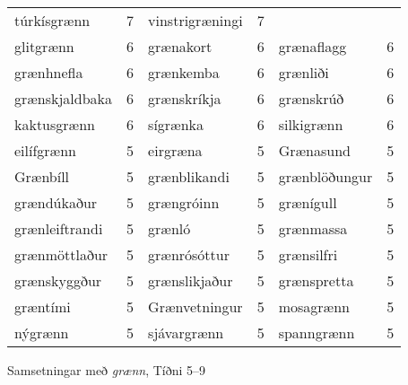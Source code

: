 \documentclass[../samsetningasafn.tex]{subfiles}
\begin{document}
\begin{wordlist}[H]
\begin{tcolorbox}
\begin{tabular}{BlBlBl}
		túrkísgrænn		& 7		& 		
		vinstrigræningi	& 7		\\ 	
		glitgrænn		& 6		& 	
		grænakort		& 6		& 	
		grænaflagg		& 6		\\ 	
		grænhnefla		& 6		& 	
		grænkemba		& 6		& 	
		grænliði			& 6		\\ 	
		grænskjaldbaka	& 6		& 	
		grænskríkja		& 6		& 	
		grænskrúð		& 6		\\ 	
		kaktusgrænn		& 6		& 
		sígrænka		& 6		& 	
		silkigrænn		& 6		\\ 
		eilífgrænn		& 5		& 	
		eirgræna		& 5		& 	
		Grænasund		& 5		\\ 	
		Grænbíll			& 5		& 	
		grænblikandi		& 5		& 
		grænblöðungur	& 5		\\ 	
		grændúkaður	& 5		& 
		grængróinn		& 5		& 	
		grænígull		& 5		\\ 	
		grænleiftrandi	& 5		& 
		grænló			& 5		& 	
		grænmassa		& 5		\\ 	
		grænmöttlaður	& 5		& 	
		grænrósóttur		& 5		& 
		grænsilfri		& 5		\\ 	
		grænskyggður	& 5		& 	
		grænslikjaður	& 5		& 	
		grænspretta		& 5		\\ 	
		græntími		& 5		& 	
		Grænvetningur	& 5		& 	
		mosagrænn		& 5		\\ 	
		nýgrænn		& 5		& 	
		sjávargrænn		& 5		& 	
		spanngrænn		& 5		 	
	\end{tabular}

\end{tcolorbox}
	\caption{Samsetningar með \textit{grænn}, Tíðni 5--9}
	\label{listi:graent.5}
\end{wordlist}
\end{document}

